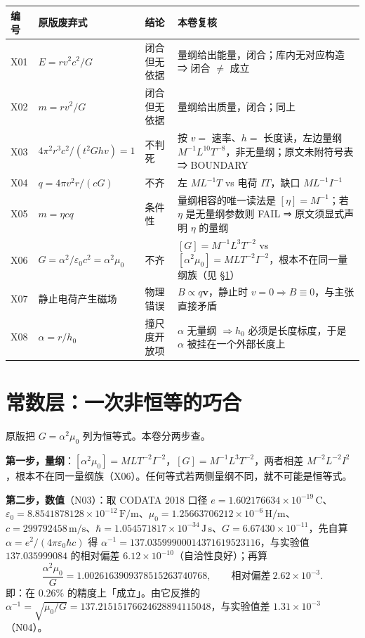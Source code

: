 \documentclass[UTF8,fontset=fandol,11pt]{ctexart}
\newcommand{\bx}{\boldsymbol}
\begin{document}
\begin{center}
\begin{tabular}{p{1.3cm}p{4.6cm}p{2.2cm}p{8.0cm}}
\toprule
编号 & 原版废弃式 & 结论 & 本卷复核 \\
\midrule
X01 & $E=r v^2c^2/G$ & 闭合但无依据 & 量纲给出能量，闭合；库内无对应构造 ⇒ 闭合 $\neq$ 成立 \\
X02 & $m=r v^2/G$ & 闭合但无依据 & 量纲给出质量，闭合；同上 \\
X03 & $4\pi^2r^3c^2/(t^2Ghv)=1$ & 不判死 & 按 $v=$ 速率、$h=$ 长度读，左边量纲 $M^{-1}L^{10}T^{-8}$，非无量纲；原文未附符号表 ⇒ BOUNDARY \\
X04 & $q=4\pi v^2r/(cG)$ & 不齐 & 左 $ML^{-1}T$ vs 电荷 $IT$，缺口 $ML^{-1}I^{-1}$ \\
X05 & $m=\eta c q$ & 条件性 & 量纲相容的唯一读法是 $[\eta]=M^{-1}$；若 $\eta$ 是无量纲参数则 FAIL ⇒ 原文须显式声明 $\eta$ 的量纲 \\
X06 & $G=\alpha^2/\varepsilon_0c^2=\alpha^2\mu_0$ & 不齐 & $[G]=M^{-1}L^3T^{-2}$ vs $[\alpha^2\mu_0]=MLT^{-2}I^{-2}$，根本不在同一量纲族（见 \S\ref{sec:const}） \\
X07 & 静止电荷产生磁场 & 物理错误 & $B\propto q\bx v$，静止时 $v=0\Rightarrow B\equiv0$，与主张直接矛盾 \\
X08 & $\alpha=r/h_0$ & 撞尺度开放项 & $\alpha$ 无量纲 $\Rightarrow h_0$ 必须是长度标度，于是 $\alpha$ 被挂在一个外部长度上 \\
\bottomrule
\end{tabular}
\end{center}

\section{常数层：一次非恒等的巧合}
\label{sec:const}

原版把 $G=\alpha^2\mu_0$ 列为恒等式。本卷分两步查。

\textbf{第一步，量纲}：$[\alpha^2\mu_0]=MLT^{-2}I^{-2}$，$[G]=M^{-1}L^3T^{-2}$，两者相差 $M^{-2}L^{-2}I^{2}$，根本不在同一量纲族（X06）。任何等式若两侧量纲不同，就不可能是恒等式。

\textbf{第二步，数值}（N03）：取 CODATA 2018 口径 $e=1.602176634\times10^{-19}\,\mathrm C$、$\varepsilon_0=8.8541878128\times10^{-12}\,\mathrm{F/m}$、$\mu_0=1.25663706212\times10^{-6}\,\mathrm{H/m}$、$c=299792458\,\mathrm{m/s}$、$\hbar=1.054571817\times10^{-34}\,\mathrm{J\,s}$、$G=6.67430\times10^{-11}$，先自算 $\alpha=e^2/(4\pi\varepsilon_0\hbar c)$ 得 $\alpha^{-1}=137.03599900014371619523116$，与实验值 $137.035999084$ 的相对偏差 $6.12\times10^{-10}$（自洽性良好）；再算
\begin{equation}
  \frac{\alpha^2\mu_0}{G}=1.0026163909378515263740768 ,
  \qquad \text{相对偏差}\ 2.62\times10^{-3}.
\end{equation}
即：在 $0.26\%$ 的精度上「成立」。由它反推的 $\alpha^{-1}=\sqrt{\mu_0/G}=137.21515176624628894115048$，与实验值差 $1.31\times10^{-3}$（N04）。
\end{document}
